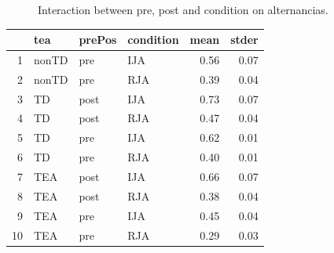 \documentclass{article}
\begin{document}
\begin{figure}[H]
  \caption{Interaction between pre, post and condition on alternancias.}
  \noindent{}
  \centering
\end{figure}

\begin{table}[ht]
\centering
\begin{tabular}{rlllrr}
  \hline
 & tea & prePos & condition & mean & stder \\ 
  \hline
1 & nonTD & pre & IJA & 0.56 & 0.07 \\ 
  2 & nonTD & pre & RJA & 0.39 & 0.04 \\ 
  3 & TD & post & IJA & 0.73 & 0.07 \\ 
  4 & TD & post & RJA & 0.47 & 0.04 \\ 
  5 & TD & pre & IJA & 0.62 & 0.01 \\ 
  6 & TD & pre & RJA & 0.40 & 0.01 \\ 
  7 & TEA & post & IJA & 0.66 & 0.07 \\ 
  8 & TEA & post & RJA & 0.38 & 0.04 \\ 
  9 & TEA & pre & IJA & 0.45 & 0.04 \\ 
  10 & TEA & pre & RJA & 0.29 & 0.03 \\ 
   \hline
\end{tabular}
\end{table}
\end{document}
